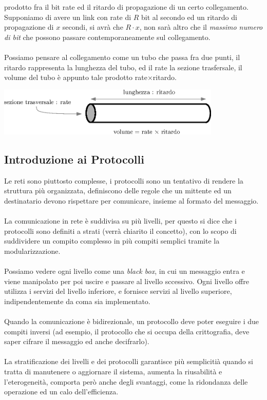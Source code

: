 \documentclass[12pt, letterpaper]{article}
\newcommand{\acc}{\\\hphantom{}\\}
\begin{document}
prodotto fra il bit rate ed il ritardo di propagazione di un certo 
collegamento. Supponiamo di avere un link con rate di $R$ bit al secondo ed un ritardo di propagazione 
di $x$ secondi, si avrà che $R\cdot x$, non sarà altro che il \textit{massimo numero di bit} che 
possono passare contemporaneamente sul collegamento.\acc 
Possiamo pensare al collegamento come un tubo che passa fra due punti, il ritardo rappresenta la lunghezza 
del tubo, ed il rate la sezione trasfersale, il volume del tubo è appunto tale prodotto rate$\times$ritardo.
\begin{center}
    \includegraphics[width=0.8\textwidth ]{images/tubo.eps}
\end{center}
\subsection{Introduzione ai Protocolli}
Le reti sono piuttosto complesse, i protocolli sono un tentativo di rendere la struttura più 
organizzata, definiscono delle regole che un mittente ed un destinatario devono rispettare per 
comunicare, insieme al formato del messaggio.\acc 
La comunicazione in rete è suddivisa su più livelli, per questo si dice che i protocolli sono 
definiti a strati (verrà chiarito il concetto), con lo scopo di suddividere un compito complesso 
in più compiti semplici tramite la modularizzazione.\acc 
Possiamo vedere ogni livello come una \textit{black box}, in cui un messaggio entra e viene 
manipolato per poi uscire e passare al livello sccessivo. Ogni livello offre utilizza i servizi 
del livello inferiore, e fornisce servizi al livello superiore, indipendentemente da coma sia implementato. \acc 
Quando la comunicazione è bidirezionale, un protocollo deve poter eseguire i due compiti inversi (ad esempio, 
il protocollo che si occupa della crittografia, deve saper cifrare il messaggio ed anche decifrarlo).\acc
La stratificazione dei livelli e dei protocolli garantisce più semplicitià quando si tratta di manutenere 
o aggiornare il sistema, aumenta la riusabilità e l'eterogeneità, comporta però anche degli svantaggi, 
come la ridondanza delle operazione ed un calo dell'efficienza.
\end{document}
